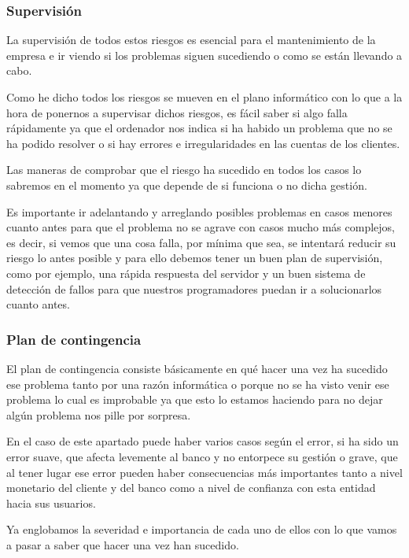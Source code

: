\subsubsection{Supervisión}

La supervisión de todos estos riesgos es esencial para el mantenimiento de la empresa e ir viendo si los problemas siguen sucediendo o como se están llevando a cabo.

Como he dicho todos los riesgos se mueven en el plano informático con lo que a la hora de ponernos a supervisar dichos riesgos, es fácil saber si algo falla rápidamente ya que el ordenador nos indica si ha habido un problema que no se ha podido resolver o si hay errores e irregularidades en las cuentas de los clientes.

Las maneras de comprobar que el riesgo ha sucedido en todos los casos lo sabremos en el momento ya que depende de si funciona o no dicha gestión.

Es importante ir adelantando y arreglando posibles problemas en casos menores cuanto antes para que el problema no se agrave con casos mucho más complejos, es decir, si vemos que una cosa falla, por mínima que sea, se intentará reducir su riesgo lo antes posible y para ello debemos tener un buen plan de supervisión, como por ejemplo, una rápida respuesta del servidor y un buen sistema de detección de fallos para que nuestros programadores puedan ir a solucionarlos cuanto antes.

\subsubsection{Plan de contingencia}

El plan de contingencia consiste básicamente en qué hacer una vez ha sucedido ese problema tanto por una razón informática o porque no se ha visto venir ese problema lo cual es improbable ya que esto lo estamos haciendo para no dejar algún problema nos pille por sorpresa.

En el caso de este apartado puede haber varios casos según el error, si ha sido un error suave, que afecta levemente al banco y no entorpece su gestión o grave, que al tener lugar ese error pueden haber consecuencias más importantes tanto a nivel monetario del cliente y del banco como a nivel de confianza con esta entidad hacia sus usuarios.

Ya englobamos la severidad e importancia de cada uno de ellos con lo que vamos a pasar a saber que hacer una vez han sucedido.

